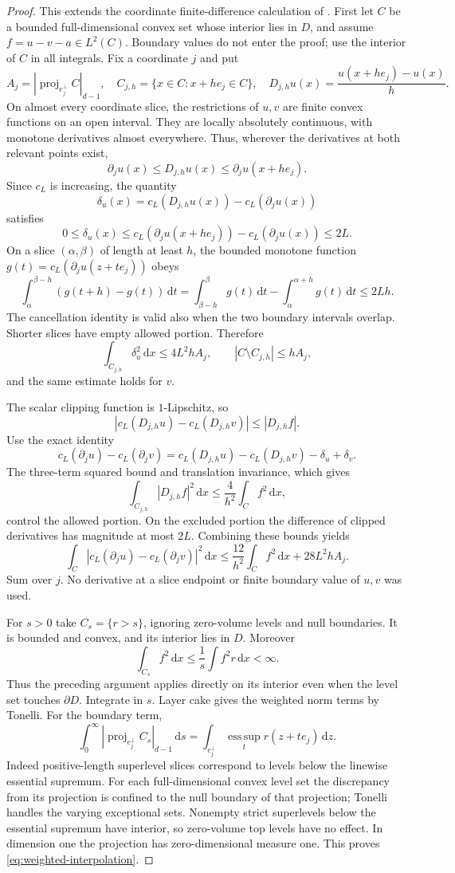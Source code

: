 \documentclass[11pt]{article}
\numberwithin{equation}{section}
\theoremstyle{remark}
\newcommand{\esssup}{\operatorname*{ess\,sup}}
\newcommand{\dd}{\,\mathrm d}
\newcommand{\proj}{\operatorname{proj}}
\begin{document}
\begin{proof}
This extends the coordinate finite-difference calculation of \cite{OpenAI2026}. First let $C$ be a bounded full-dimensional convex set whose interior lies in $D$, and assume $f=u-v-a\in L^2(C)$. Boundary values do not enter the proof; use the interior of $C$ in all integrals. Fix a coordinate $j$ and put
\[
 A_j=|\proj_{e_j^\perp}C|_{d-1},\quad
 C_{j,h}=\{x\in C:x+he_j\in C\},\quad
 D_{j,h}u(x)=\frac{u(x+he_j)-u(x)}h.
\]
On almost every coordinate slice, the restrictions of $u,v$ are finite convex functions on an open interval. They are locally absolutely continuous, with monotone derivatives almost everywhere. Thus, wherever the derivatives at both relevant points exist,
\[
 \partial_j u(x)\le D_{j,h}u(x)\le\partial_j u(x+he_j).
\]
Since $c_L$ is increasing, the quantity
\[
 \delta_u(x)=c_L(D_{j,h}u(x))-c_L(\partial_j u(x))
\]
satisfies
\[
 0\le\delta_u(x)\le c_L(\partial_j u(x+he_j))
                       -c_L(\partial_j u(x))\le2L.
\]
On a slice $(\alpha,\beta)$ of length at least $h$, the bounded monotone function $g(t)=c_L(\partial_j u(z+te_j))$ obeys
\[
 \int_\alpha^{\beta-h}(g(t+h)-g(t))\dd t
 =\int_{\beta-h}^\beta g(t)\dd t-\int_\alpha^{\alpha+h}g(t)\dd t
 \le2Lh.
\]
The cancellation identity is valid also when the two boundary intervals overlap. Shorter slices have empty allowed portion. Therefore
\[
 \int_{C_{j,h}}\delta_u^2\dd x\le4L^2hA_j,
 \qquad |C\setminus C_{j,h}|\le hA_j,
\]
and the same estimate holds for $v$.

The scalar clipping function is $1$-Lipschitz, so
\[
 |c_L(D_{j,h}u)-c_L(D_{j,h}v)|\le|D_{j,h}f|.
\]
Use the exact identity
\[
 c_L(\partial_j u)-c_L(\partial_j v)
 =c_L(D_{j,h}u)-c_L(D_{j,h}v)-\delta_u+\delta_v.
\]
The three-term squared bound and translation invariance, which gives
\[
 \int_{C_{j,h}}|D_{j,h}f|^2\dd x\le\frac4{h^2}\int_Cf^2\dd x,
\]
control the allowed portion. On the excluded portion the difference of clipped derivatives has magnitude at most $2L$. Combining these bounds yields
\[
 \int_C|c_L(\partial_j u)-c_L(\partial_j v)|^2\dd x
 \le\frac{12}{h^2}\int_Cf^2\dd x+28L^2hA_j.
\]
Sum over $j$. No derivative at a slice endpoint or finite boundary value of $u,v$ was used.

For $s>0$ take $C_s=\{r>s\}$, ignoring zero-volume levels and null boundaries. It is bounded and convex, and its interior lies in $D$. Moreover
\[
 \int_{C_s}f^2\dd x\le\frac1s\int f^2r\dd x<\infty.
\]
Thus the preceding argument applies directly on its interior even when the level set touches $\partial D$. Integrate in $s$. Layer cake gives the weighted norm terms by Tonelli. For the boundary term,
\[
 \int_0^\infty|\proj_{e_j^\perp}C_s|_{d-1}\dd s
 =\int_{e_j^\perp}\esssup_t r(z+te_j)\dd z.
\]
Indeed positive-length superlevel slices correspond to levels below the linewise essential supremum. For each full-dimensional convex level set the discrepancy from its projection is confined to the null boundary of that projection; Tonelli handles the varying exceptional sets. Nonempty strict superlevels below the essential supremum have interior, so zero-volume top levels have no effect. In dimension one the projection has zero-dimensional measure one. This proves \eqref{eq:weighted-interpolation}.
\end{proof}
\end{document}
